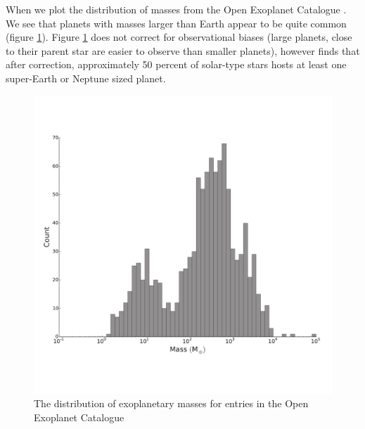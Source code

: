 When we plot the distribution of masses from the Open Exoplanet Catalogue \citep{rein2015}. We see that planets with masses larger than Earth appear to be quite common (figure \ref{fig:exoplanetmass}). Figure \ref{fig:exoplanetmass} does not correct for observational biases (large planets, close to their parent star are easier to observe than smaller planets), however \citet{mayor2011harps} finds that after correction, approximately 50 percent of solar-type stars hosts at least one super-Earth or Neptune sized planet.
\begin{figure}
	\centering
        \includegraphics[width=\textwidth]{Chapter3/Figures/ExoplanetsMass.pdf}
        \caption{The distribution of exoplanetary masses for entries in the Open Exoplanet Catalogue \citep{rein2015}}
        \label{fig:exoplanetmass}
\end{figure}

